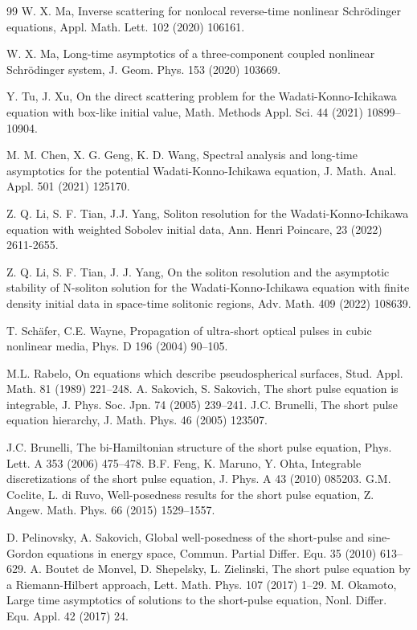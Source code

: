 \documentclass[11pt]{article}
\numberwithin{equation}{section}
\begin{document}
\begin{thebibliography}{99}
 W. X. Ma, Inverse scattering for nonlocal reverse-time nonlinear Schr\"odinger equations, Appl. Math. Lett. 102 (2020) 106161.

 W. X. Ma, Long-time asymptotics of a three-component coupled nonlinear Schr\"odinger system, J. Geom. Phys. 153 (2020) 103669.

 Y. Tu, J. Xu, On the direct scattering problem for the Wadati-Konno-Ichikawa equation with box-like initial value, Math. Methods Appl. Sci. 44 (2021) 10899--10904.

 M. M.  Chen, X. G.  Geng, K. D.  Wang, Spectral analysis and long-time asymptotics for the potential Wadati-Konno-Ichikawa equation, J. Math. Anal.  Appl.   501 (2021) 125170.



 Z. Q. Li, S. F. Tian, J.J. Yang, Soliton resolution   for the Wadati-Konno-Ichikawa equation with weighted Sobolev initial data, Ann. Henri Poincare,  23 (2022) 2611-2655.

 Z. Q. Li, S. F. Tian, J. J. Yang, On the soliton resolution and the asymptotic stability of N-soliton solution for the Wadati-Konno-Ichikawa equation with finite density initial data in space-time solitonic regions, Adv. Math. 409 (2022) 108639.

 T. Sch\"afer, C.E. Wayne, Propagation of ultra-short optical pulses in cubic nonlinear media, Phys. D 196 (2004) 90--105.

 M.L. Rabelo, On equations which describe pseudospherical surfaces, Stud. Appl. Math. 81 (1989) 221--248.
 A. Sakovich, S. Sakovich, The short pulse equation is integrable, J. Phys. Soc. Jpn. 74 (2005) 239--241.
 J.C. Brunelli, The short pulse equation hierarchy, J. Math. Phys. 46 (2005) 123507.

 J.C. Brunelli, The bi-Hamiltonian structure of the short pulse equation, Phys. Lett. A 353 (2006) 475--478.
 B.F. Feng, K. Maruno, Y. Ohta, Integrable discretizations of the short pulse equation, J. Phys. A 43 (2010) 085203.
 G.M. Coclite, L. di Ruvo, Well-posedness results for the short pulse equation, Z. Angew. Math. Phys. 66 (2015) 1529--1557.

 D. Pelinovsky, A. Sakovich, Global well-posedness of the short-pulse and sine-Gordon equations in energy space, Commun. Partial Differ. Equ. 35 (2010) 613--629.
 A. Boutet de Monvel, D. Shepelsky, L. Zielinski, The short pulse equation by a Riemann-Hilbert approach, Lett. Math. Phys. 107 (2017) 1--29.
 M. Okamoto, Large time asymptotics of solutions to the short-pulse equation, Nonl. Differ. Equ. Appl. 42 (2017) 24.


\end{thebibliography}
\end{document}
